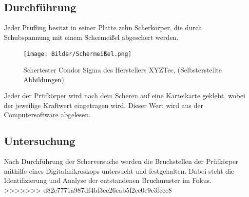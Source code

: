 \subsection{Durchführung}
Jeder Prüfling besitzt in seiner Platte zehn Scherkörper, die durch Schubspannung mit einem Schermeißel abgeschert werden.
\vspace{0.1cm}
\begin{figure}[h]
    \centering
    \texttt{[image: Bilder/Schermeißel.png]}
    \caption{Schertester Condor Sigma des Herstellers XYZTec, (Selbsterstellte Abbildungen)}
    \vspace{0.2cm}
    \label{Abb.4: Schertester Condor Sigma des Herstellers XYZTec}
\end{figure}
\vspace{0.1cm}
Jeder der Prüfkörper wird nach dem Scheren auf eine Karteikarte geklebt, wobei der jeweilige Kraftwert eingetragen wird.
Dieser Wert wird aus der Computersoftware abgelesen.
\subsection{Untersuchung}
Nach Durchführung der Scherversuche werden die Bruchstellen der Prüfkörper mithilfe eines Digitalmikroskops untersucht und festgehalten.
Dabei steht die Identifizierung und Analyse der entstandenen Bruchmuster im Fokus. 
>>>>>>> d82e7771a987df4bf3ee26cab5f2ec0e9c3fcce8
